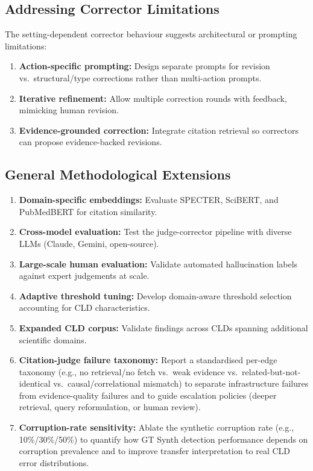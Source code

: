 \subsection{Addressing Corrector Limitations}

The setting-dependent corrector behaviour suggests architectural or prompting limitations:
\begin{enumerate}[noitemsep]
    \item \textbf{Action-specific prompting:} Design separate prompts for revision vs.\ structural/type corrections rather than multi-action prompts.
    \item \textbf{Iterative refinement:} Allow multiple correction rounds with feedback, mimicking human revision.
    \item \textbf{Evidence-grounded correction:} Integrate citation retrieval so correctors can propose evidence-backed revisions.
\end{enumerate}

\subsection{General Methodological Extensions}

\begin{enumerate}[noitemsep]
    \item \textbf{Domain-specific embeddings:} Evaluate SPECTER, SciBERT, and PubMedBERT for citation similarity.
    \item \textbf{Cross-model evaluation:} Test the judge-corrector pipeline with diverse LLMs (Claude, Gemini, open-source).
    \item \textbf{Large-scale human evaluation:} Validate automated hallucination labels against expert judgements at scale.
    \item \textbf{Adaptive threshold tuning:} Develop domain-aware threshold selection accounting for CLD characteristics.
    \item \textbf{Expanded CLD corpus:} Validate findings across CLDs spanning additional scientific domains.
    \item \textbf{Citation-judge failure taxonomy:} Report a standardised per-edge taxonomy (e.g., no retrieval/no fetch vs.\ weak evidence vs.\ related-but-not-identical vs.\ causal/correlational mismatch) to separate infrastructure failures from evidence-quality failures and to guide escalation policies (deeper retrieval, query reformulation, or human review).
    \item \textbf{Corruption-rate sensitivity:} Ablate the synthetic corruption rate (e.g., 10\%/30\%/50\%) to quantify how GT Synth detection performance depends on corruption prevalence and to improve transfer interpretation to real CLD error distributions.
\end{enumerate}

